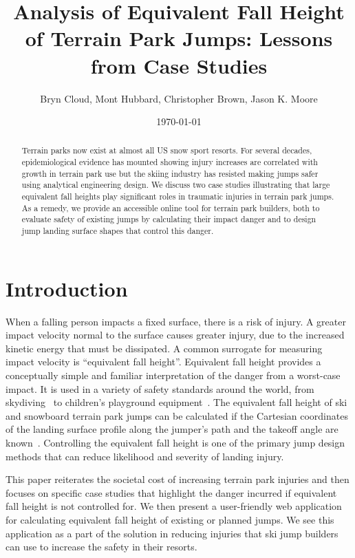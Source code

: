 \documentclass{article}
\title{Analysis of Equivalent Fall Height of Terrain Park Jumps: Lessons from
  Case Studies}
\author{Bryn Cloud, Mont Hubbard, Christopher Brown, Jason K. Moore}
\date{\today}
\begin{document}
\maketitle

\begin{abstract}
  Terrain parks now exist at almost all US snow sport resorts. For several
  decades, epidemiological evidence has mounted showing injury increases are correlated 
  with  growth in terrain park use but the skiing industry has resisted making 
  jumps safer using analytical engineering design. We discuss
  two case studies illustrating that large equivalent fall heights play
  significant roles in traumatic injuries in terrain park jumps. As a remedy, we 
  provide an accessible online tool for terrain park builders, both to evaluate 
  safety of existing jumps by calculating their impact danger and to design jump 
  landing surface shapes that control this danger. 
\end{abstract}

\section{Introduction}
%
When a falling person impacts a fixed surface, there is a risk of
injury. A greater impact velocity normal to the surface causes greater
injury, due to the increased kinetic energy that must be dissipated. A common surrogate
for measuring impact velocity is ``equivalent fall height''.  Equivalent fall
height provides a conceptually simple and familiar interpretation of the danger
from a worst-case impact. It is used in a variety of safety
standards around the world, from skydiving~ to children's
playground equipment~\cite{Chalmers1996}. The equivalent fall height of ski and
snowboard terrain park jumps can be calculated if the Cartesian coordinates of
the landing surface profile along the jumper's path and the takeoff angle are
known~\cite{Hubbard2012}. Controlling the equivalent fall height is one of
the primary jump design methods that can reduce likelihood and severity of landing injury. 


This paper reiterates the societal cost of increasing terrain park injuries
and then focuses on specific case studies that highlight the danger incurred if
equivalent fall height is not controlled for. We then present a user-friendly
web application for calculating equivalent fall height of existing or planned
jumps. We see this application as a part of the solution in reducing injuries
that ski jump builders can use to increase the safety in their resorts.
\end{document}
